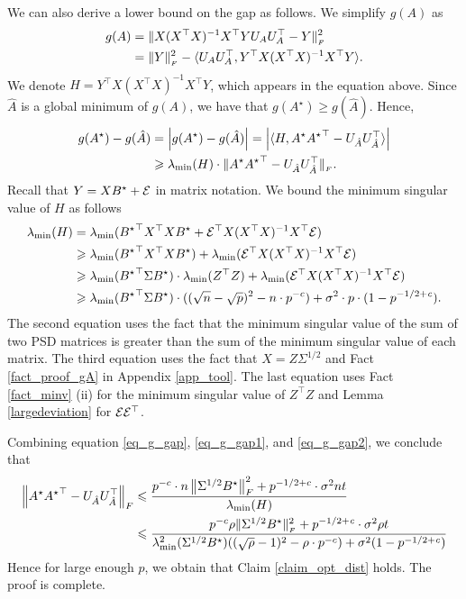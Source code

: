 	We can also derive a lower bound on the gap as follows.
	We simplify $g(A)$ as
	\begin{align*}
		g(A)  &= \|X (X^{\top}X)^{-1} X^{\top} Y U_A U_A^{\top} - Y\|_{_{F}}^2 \\
					&= \|Y\|_{_{F}}^2 - \langle U_A U_A^{\top}, Y^{\top} X (X^{\top} X)^{-1} X^{\top} Y \rangle.
	\end{align*}
	We denote $H = Y^{\top} X (X^{\top} X)^{-1} X^{\top} Y$, which appears in the equation above.
	Since $\hat{A}$ is a global minimum of $g(A)$, we have that $g(A^{\star}) \ge g(\hat{A})$.
	Hence,
	\begin{align}
		g(A^{\star}) - g(\hat{A}) &= \left\lvert g(A^{\star}) - g(\hat{A})\right\rvert = \left\lvert\langle H, A^{\star} {A^{\star}}^{\top} - U_{\hat{A}} U_{\hat{A}}^{\top} \rangle\right\rvert \nonumber \\
												&\geqslant \lambda_{\min}(H) \cdot \|A^{\star} {A^{\star}}^{\top} - U_{\hat{A}} U_{\hat{A}}^{\top}\|_{_{F}}. \label{eq_g_gap1}
	\end{align}
	Recall that $Y = X B^{\star} + \mathcal{E}$ in matrix notation.
	We bound the minimum singular value of $H$ as follows
	\begin{align}
		\lambda_{\min}(H) &= \lambda_{\min}({B^{\star}}^{\top} X^{\top} X B^{\star} + \mathcal{E}^{\top} X (X^{\top} X)^{-1} X^{\top} \mathcal{E}) \nonumber \\
		&\geqslant \lambda_{\min}({B^{\star}}^{\top}X^{\top}X B^{\star}) + \lambda_{\min}(\mathcal{E}^{\top} X (X^{\top} X)^{-1} X^{\top} \mathcal{E}) \nonumber \\
		&\geqslant \lambda_{\min}({B^{\star}}^{\top}\Sigma B^{\star}) \cdot \lambda_{\min}(Z^{\top}Z) + \lambda_{\min}(\mathcal{E}^{\top} X (X^{\top} X)^{-1} X^{\top} \mathcal{E}) \nonumber \\
		&\geqslant \lambda_{\min}({B^{\star}}^{\top}\Sigma B^{\star}) \cdot ((\sqrt n - \sqrt p)^2 - n \cdot p^{-c}) + \sigma^2 \cdot p \cdot (1 - p^{-1/2 + {\mathit{c}}}). \label{eq_g_gap2}
	\end{align}
	The second equation uses the fact that the minimum singular value of the sum of two PSD matrices is greater than the sum of the minimum singular value of each matrix.
	The third equation uses the fact that $X = Z \Sigma^{1/2}$ and Fact \ref{fact_proof_gA} in Appendix \ref{app_tool}.
	The last equation uses Fact \ref{fact_minv} (ii) for the minimum singular value of $Z^{\top}Z$ and Lemma \ref{largedeviation} for $\mathcal{E}\mathcal{E}^{\top}$.

	Combining equation \eqref{eq_g_gap}, \eqref{eq_g_gap1}, and \eqref{eq_g_gap2}, we conclude that
	\begin{align*}
		\left\| A^{\star} {A^{\star}}^{\top}- U_{\hat{A}} U_{\hat{A}}^{\top} \right\|_{F}
		&\leqslant \frac{p^{-c} \cdot n \left\| \Sigma^{1/2} B^{\star} \right\|_{F}^2 + p^{-1/2 + c} \cdot \sigma^2 nt} {\lambda_{\min}(H)} \\
		&\leqslant \frac{p^{-c} \rho \|\Sigma^{1/2} B^{\star}\|_{_{F}}^2 + p^{-1/2 + {\mathit{c}}} \cdot \sigma^2 \rho t}{\lambda_{\min}^2(\Sigma^{1/2} B^{\star}) ((\sqrt{\rho} - 1)^2 - \rho \cdot p^{-c}) + \sigma^2 (1 - p^{-1/2 + {\mathit{c}}})}
	\end{align*}
	Hence for large enough $p$, we obtain that Claim \ref{claim_opt_dist} holds.
	The proof is complete.

